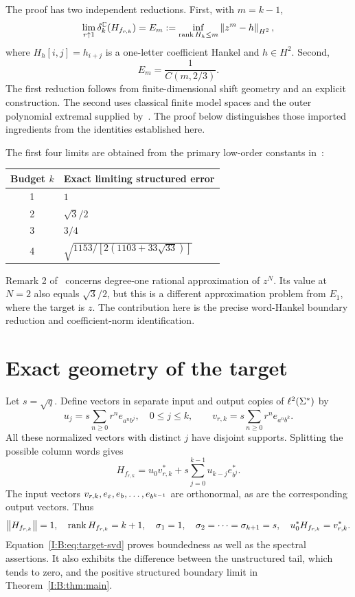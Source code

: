 The proof has two independent reductions. First, with $m=k-1$,
\[
\lim_{r\uparrow1}\delta_k^{\mathbb C}(H_{f_{r,k}})
=E_m:=\inf_{\operatorname{rank} H_h\le m}\left\lVert z^m-h\right\rVert_{H^2},
\]
where $H_h[i,j]=h_{i+j}$ is a one-letter coefficient Hankel and $h\in H^2$. Second,
\[
E_m=\frac1{C(m,2/3)}.
\]
The first reduction follows from finite-dimensional shift geometry and an explicit construction. The second uses classical finite model spaces and the outer polynomial extremal supplied by~\cite{outer2026}. The proof below distinguishes those imported ingredients from the identities established here.

The first four limits are obtained from the primary low-order constants in~\cite{brevig2020}:
\begin{center}
\begin{tabular}{cl}
\toprule Budget $k$ & Exact limiting structured error\\\midrule
1 & $1$\\
2 & $\sqrt3/2$\\
3 & $3/4$\\
4 & $\sqrt{1153/[2(1103+33\sqrt{33})]}$\\\bottomrule
\end{tabular}
\end{center}
Remark 2 of~\cite{rational2026} concerns degree-one rational approximation of $z^N$. Its value at $N=2$ also equals $\sqrt3/2$, but this is a different approximation problem from $E_1$, where the target is $z$. The contribution here is the precise word-Hankel boundary reduction and coefficient-norm identification.

\section{Exact geometry of the target}
Let $s=\sqrt q$. Define vectors in separate input and output copies of $\ell^2(\Sigma^*)$ by
\[
u_j=s\sum_{n\ge0}r^n e_{a^n b^j},\quad 0\le j\le k,
\qquad v_{r,k}=s\sum_{n\ge0}r^n e_{a^n b^k}.
\]
All these normalized vectors with distinct $j$ have disjoint supports. Splitting the possible column words gives
\begin{equation}\label{I:B:eq:target-svd}
H_{f_{r,k}}=u_0v_{r,k}^*+s\sum_{j=0}^{k-1}u_{k-j}e_{b^j}^*.
\end{equation}
The input vectors $v_{r,k},e_\varepsilon,e_b,\ldots,e_{b^{k-1}}$ are orthonormal, as are the corresponding output vectors. Thus
\[
\left\lVert H_{f_{r,k}}\right\rVert=1,\quad \operatorname{rank} H_{f_{r,k}}=k+1,\quad
\sigma_1=1,\quad\sigma_2=\cdots=\sigma_{k+1}=s,
\quad u_0^*H_{f_{r,k}}=v_{r,k}^*.
\]
Equation~\eqref{I:B:eq:target-svd} proves boundedness as well as the spectral assertions. It also exhibits the difference between the unstructured tail, which tends to zero, and the positive structured boundary limit in Theorem~\ref{I:B:thm:main}.

